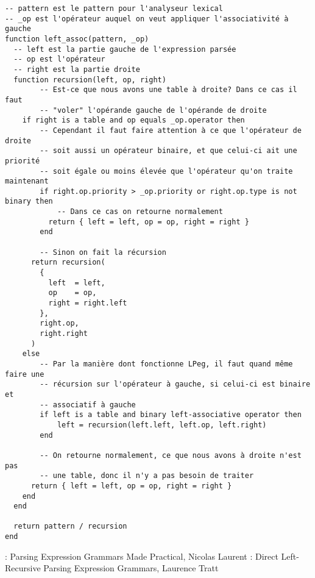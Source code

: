 \documentclass{article}
\begin{document}
\begin{verbatim}
-- pattern est le pattern pour l'analyseur lexical
-- _op est l'opérateur auquel on veut appliquer l'associativité à gauche
function left_assoc(pattern, _op)
  -- left est la partie gauche de l'expression parsée
  -- op est l'opérateur
  -- right est la partie droite
  function recursion(left, op, right)
		-- Est-ce que nous avons une table à droite? Dans ce cas il faut
		-- "voler" l'opérande gauche de l'opérande de droite
    if right is a table and op equals _op.operator then
	    -- Cependant il faut faire attention à ce que l'opérateur de droite
	    -- soit aussi un opérateur binaire, et que celui-ci ait une priorité
	    -- soit égale ou moins élevée que l'opérateur qu'on traite maintenant
	    if right.op.priority > _op.priority or right.op.type is not binary then
		    -- Dans ce cas on retourne normalement
	      return { left = left, op = op, right = right }
	    end
    
	    -- Sinon on fait la récursion
      return recursion(
        {
          left  = left,
          op    = op,
          right = right.left
        },
        right.op,
        right.right
      )
    else
	    -- Par la manière dont fonctionne LPeg, il faut quand même faire une
	    -- récursion sur l'opérateur à gauche, si celui-ci est binaire et
	    -- associatif à gauche
	    if left is a table and binary left-associative operator then
		    left = recursion(left.left, left.op, left.right)
	    end
			
	    -- On retourne normalement, ce que nous avons à droite n'est pas
	    -- une table, donc il n'y a pas besoin de traiter
      return { left = left, op = op, right = right }
    end
  end
  
  return pattern / recursion
end
\end{verbatim}
\newpage
\noindent[1]: Parsing Expression Grammars Made Practical, Nicolas Laurent \newline
[2]: Direct Left-Recursive Parsing Expression Grammars, Laurence Tratt
\end{document}
